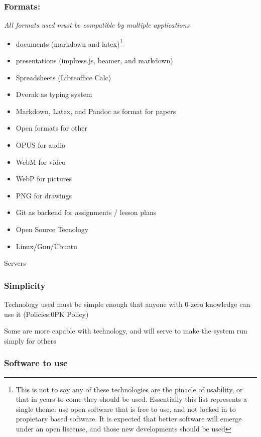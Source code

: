 \documentclass[CSHFoundation.tex]{subfiles}
\begin{document}
\subsubsection{Formats:}

\emph{All formats used must be compatible by multiple applications}

\begin{itemize}
\item documents (markdown and latex)\footnote{This is not to say any of these technologies are the pinacle of usability, or that in years to come they should be used. Essentially this list represents a single theme: use open software that is free to use, and not locked in to propietary based software. It is expected that better software will emerge under an open liscense, and those new developments should be used}
\item presentations (implress.js, beamer, and markdown)
\item Spreadsheets (Libreoffice Calc)
\item Dvorak as typing system
\item Markdown, Latex, and Pandoc as format for papers
\item Open formats for other
\item OPUS for audio
\item WebM for video
\item WebP for pictures
\item PNG for drawings
\item Git as backend for assignments / lesson plans
\item Open Source Tecnology
\item Linux/Gnu/Ubuntu
\end{itemize}Servers

\subsubsection{Simplicity}

Technology used must be simple enough that anyone with 0-zero knowledge can use it (Policies:0PK Policy)

Some are more capable with technology, and will serve to make the system run simply for others

\subsubsection{Software to use}
\end{document}
